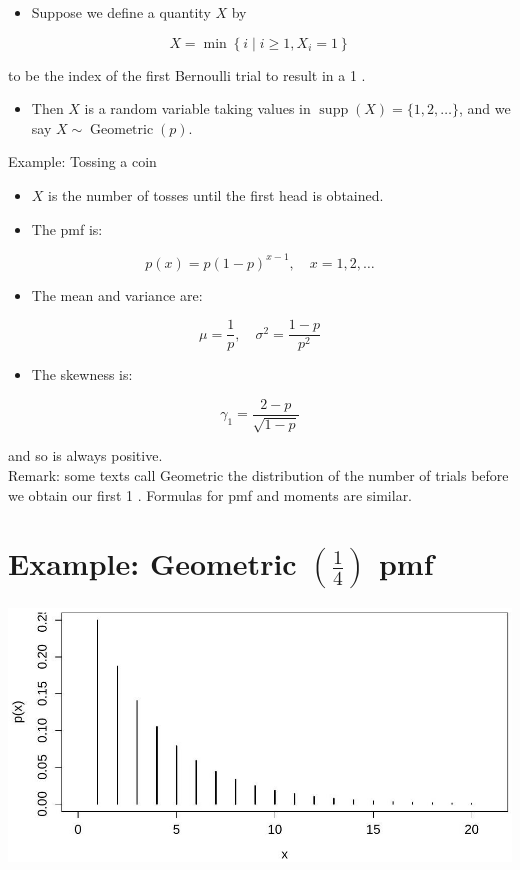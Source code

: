 \documentclass[10pt]{article}
\begin{document}
\begin{itemize}
  \item Suppose we define a quantity $X$ by
\end{itemize}

$$
X=\min \left\{i \mid i \geq 1, X_{i}=1\right\}
$$

to be the index of the first Bernoulli trial to result in a 1 .

\begin{itemize}
  \item Then $X$ is a random variable taking values in $\operatorname{supp}(X)=\{1,2, \ldots\}$, and we say $X \sim \operatorname{Geometric}(p)$.
\end{itemize}

Example: Tossing a coin

\begin{itemize}
  \item $X$ is the number of tosses until the first head is obtained.
  \item The pmf is:
\end{itemize}

$$
p(x)=p(1-p)^{x-1}, \quad x=1,2, \ldots
$$

\begin{itemize}
  \item The mean and variance are:
\end{itemize}

$$
\mu=\frac{1}{p}, \quad \sigma^{2}=\frac{1-p}{p^{2}}
$$

\begin{itemize}
  \item The skewness is:
\end{itemize}

$$
\gamma_{1}=\frac{2-p}{\sqrt{1-p}}
$$

and so is always positive.\\
Remark: some texts call Geometric the distribution of the number of trials before we obtain our first 1 . Formulas for pmf and moments are similar.

\section*{Example: Geometric $\left(\frac{1}{4}\right)$ pmf}
\begin{center}
\includegraphics[max width=\textwidth]{2025_05_11_35704811148ad612caa6g-33}
\end{center}
\end{document}
